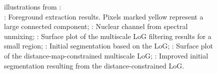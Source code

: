 \begin{figure}[h]
%
\caption{%
illustrations from \cite{al2009improved}:\\
: Foreground extraction results. Pixels marked yellow represent a large connected component;
: Nuclear channel from spectral unmixing;
: Surface plot of the multiscale LoG filtering results for a small region;
:  Initial segmentation based on the LoG;
: Surface plot of the distance-map-constrained multiscale LoG;
:  Improved initial segmentation resulting from the distance-constrained LoG.
}
  \label{fig:farsightMLOG}
\end{figure}
\clearpage

